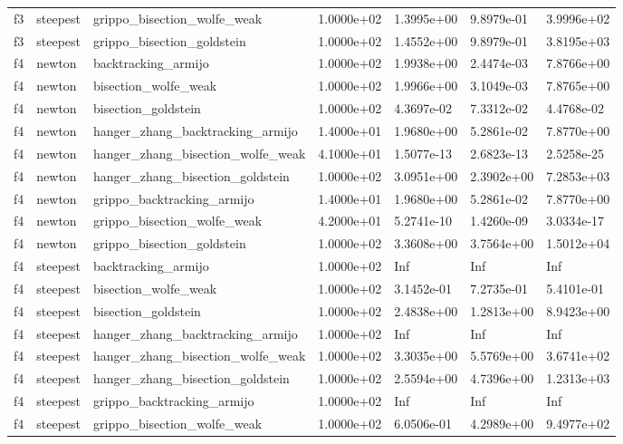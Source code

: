 \documentclass[a4paper,11pt]{article}
\numberwithin{equation}{section} %
\begin{document}
\begin{longtable}{p{1.5cm}|p{1.5cm}|p{4cm}|p{2cm}|p{2cm}|p{2cm}|p{2cm}}
        f3 & steepest & grippo\_bisection\_wolfe\_weak & 1.0000e+02 & 1.3995e+00 & 9.8979e-01 & 3.9996e+02 \\
        f3 & steepest & grippo\_bisection\_goldstein & 1.0000e+02 & 1.4552e+00 & 9.8979e-01 & 3.8195e+03 \\
        f4 & newton & backtracking\_armijo & 1.0000e+02 & 1.9938e+00 & 2.4474e-03 & 7.8766e+00 \\
        f4 & newton & bisection\_wolfe\_weak & 1.0000e+02 & 1.9966e+00 & 3.1049e-03 & 7.8765e+00 \\
        f4 & newton & bisection\_goldstein & 1.0000e+02 & 4.3697e-02 & 7.3312e-02 & 4.4768e-02 \\
        f4 & newton & hanger\_zhang\_backtracking\_armijo & 1.4000e+01 & 1.9680e+00 & 5.2861e-02 & 7.8770e+00 \\
        f4 & newton & hanger\_zhang\_bisection\_wolfe\_weak & 4.1000e+01 & 1.5077e-13 & 2.6823e-13 & 2.5258e-25 \\
        f4 & newton & hanger\_zhang\_bisection\_goldstein & 1.0000e+02 & 3.0951e+00 & 2.3902e+00 & 7.2853e+03 \\
        f4 & newton & grippo\_backtracking\_armijo & 1.4000e+01 & 1.9680e+00 & 5.2861e-02 & 7.8770e+00 \\
        f4 & newton & grippo\_bisection\_wolfe\_weak & 4.2000e+01 & 5.2741e-10 & 1.4260e-09 & 3.0334e-17 \\
        f4 & newton & grippo\_bisection\_goldstein & 1.0000e+02 & 3.3608e+00 & 3.7564e+00 & 1.5012e+04 \\
        f4 & steepest & backtracking\_armijo & 1.0000e+02 & Inf & Inf & Inf \\
        f4 & steepest & bisection\_wolfe\_weak & 1.0000e+02 & 3.1452e-01 & 7.2735e-01 & 5.4101e-01 \\
        f4 & steepest & bisection\_goldstein & 1.0000e+02 & 2.4838e+00 & 1.2813e+00 & 8.9423e+00 \\
        f4 & steepest & hanger\_zhang\_backtracking\_armijo & 1.0000e+02 & Inf & Inf & Inf \\
        f4 & steepest & hanger\_zhang\_bisection\_wolfe\_weak & 1.0000e+02 & 3.3035e+00 & 5.5769e+00 & 3.6741e+02 \\
        f4 & steepest & hanger\_zhang\_bisection\_goldstein & 1.0000e+02 & 2.5594e+00 & 4.7396e+00 & 1.2313e+03 \\
        f4 & steepest & grippo\_backtracking\_armijo & 1.0000e+02 & Inf & Inf & Inf \\
        f4 & steepest & grippo\_bisection\_wolfe\_weak & 1.0000e+02 & 6.0506e-01 & 4.2989e+00 & 9.4977e+02 \\

\end{longtable}
\end{document}
